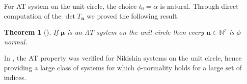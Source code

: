 \documentclass[reqno,centertags,11pt,draft]{amsart}
\newtheorem{thm}{Theorem}[section]
\newcommand{\R}{\mathbb{R}}
\newcommand{\C}{\mathbb C}
\newcommand{\N}{\mathbb{N}}
\newcommand{\T}{\mathbb{\partial\mathbb{D}}}
\newcommand{\D}{\mathbb{D}}
\newcommand{\supp}{\operatorname{supp}}
\newcommand{\calM}{{\mathcal M}}
\DeclareMathOperator{\re}{Re}
\begin{document}
    For AT system on the unit circle, the choice $t_0 = \alpha$ is natural. Through direct computation of the $\det{T_{\bm{n}}}$ we proved the following result. 
    
    \begin{thm}[\cite{KVMLOPUC}]\label{thm:AT}
        If $\bm{\mu}$ is an AT system on the unit circle then every $\bm{n} \in \N^r$ is $\phi$-normal.
    \end{thm}

    In \cite{KNik}, the AT property was verified for Nikishin systems on the unit circle, hence providing a large class of systems for which $\phi$-normality holds for a large set of indices. 
   



\end{document}
